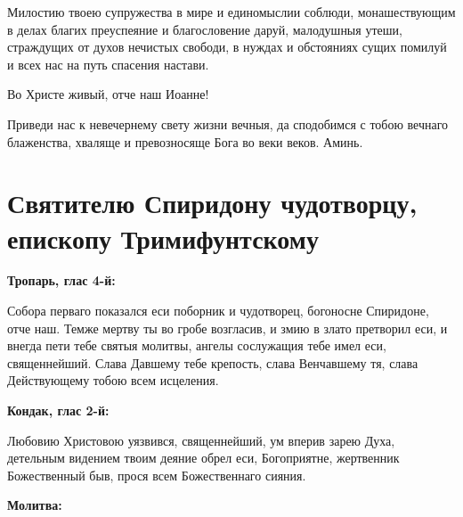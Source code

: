 Милостию твоею супружества в мире и единомыслии соблюди, монашествующим в делах благих преуспеяние и благословение даруй, малодушныя утеши, страждущих от духов нечистых свободи, в нуждах и обстояниях сущих помилуй и всех нас на путь спасения настави. 

Во Христе живый, отче наш Иоанне! 

Приведи нас к невечернему свету жизни вечныя, да сподобимся с тобою вечнаго блаженства, хваляще и превозносяще Бога во веки веков. Аминь.


\section{Святителю Спиридону чудотворцу, епископу Тримифунтскому}
 


\bfseries Тропарь, глас 4-й:\normalfont{}\nopagebreak


Собора перваго показался еси поборник и чудотворец, богоносне Спиридоне, отче наш. Темже мертву ты во гробе возгласив, и змию в злато претворил еси, и внегда пети тебе святыя молитвы, ангелы сослужащия тебе имел еси, священнейший. Слава Давшему тебе крепость, слава Венчавшему тя, слава Действующему тобою всем исцеления.


\medskip


\bfseries Кондак, глас 2-й:\normalfont{}\nopagebreak


Любовию Христовою уязвився, священнейший, ум вперив зарею Духа, детельным видением твоим деяние обрел еси, Богоприятне, жертвенник Божественный быв, прося всем Божественнаго сияния.


\medskip


\bfseries Молитва:\normalfont{}\nopagebreak


